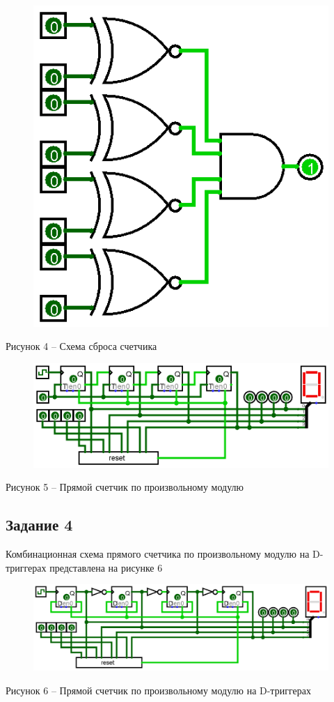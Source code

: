 \documentclass[a4paper,14pt]{extarticle}
\begin{document}
  \begin{figure}[h]
    \centering
    \includegraphics[width=0.4\linewidth]{images/s-3-1}
  \end{figure}
  \begin{center}
    Рисунок 4 – Схема сброса счетчика
  \end{center}
  
  \begin{figure}[h]
    \centering
    \includegraphics[width=0.8\linewidth]{images/s-3-2}
  \end{figure}
  \begin{center}
    Рисунок 5 – Прямой счетчик по произвольному модулю
  \end{center}
  
  \pagebreak
  \subsection*{Задание 4}
  Комбинационная схема прямого счетчика по произвольному модулю на D-триггерах представлена на рисунке 6
  
  \begin{figure}[h]
    \centering
    \includegraphics[width=0.8\linewidth]{images/s-4}
  \end{figure}
  \begin{center}
    Рисунок 6 – Прямой счетчик по произвольному модулю на D-триггерах
  \end{center}
  
\end{document}

